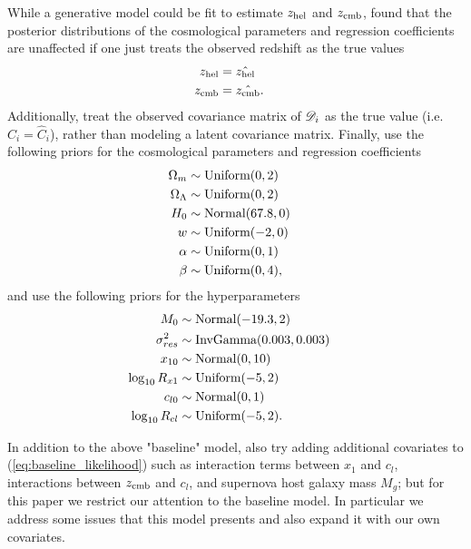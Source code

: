 While a generative model could be fit to estimate $z_{\text{hel}}$ and $z_{\text{cmb}}$, \citet{Shariff+others:2016} found that the posterior distributions of the cosmological parameters and regression coefficients are unaffected if one just treats the observed redshift as the true values
\begin{align}
z_{\text{hel}} &= \hat{z_{\text{hel}}} && \\\nonumber
z_{\text{cmb}} &= \hat{z_{\text{cmb}}}.
\end{align}
Additionally, \citet{Shariff+others:2016} treat the observed covariance matrix of $\mathcal{D}_i$ as the true value (i.e. $C_i = \hat{C}_i$), rather than modeling a latent covariance matrix. Finally, \citet{Shariff+others:2016} use the following priors for the cosmological parameters and regression coefficients
\begin{align}
\Omega_m &\sim \text{Uniform}(0, 2) && \label{eq:baseline_prior} \\\nonumber 
\Omega_\Lambda &\sim \text{Uniform}(0, 2) && \\\nonumber
H_0 &\sim \text{Normal}(67.8, 0) && \\\nonumber
w &\sim \text{Uniform}(-2, 0) && \\\nonumber
\alpha &\sim \text{Uniform}(0, 1) && \\\nonumber 
\beta &\sim \text{Uniform}(0,4),
\end{align}
and use the following priors for the hyperparameters
\begin{align}
M_0 &\sim \text{Normal}(-19.3, 2) && \label{eq:baseline_hyperprior} \\\nonumber 
\sigma_{res}^2 &\sim \text{InvGamma}(0.003, 0.003) && \\\nonumber
x_{10} &\sim \text{Normal}(0, 10) && \\\nonumber 
\log_{10} R_{x1} &\sim \text{Uniform}(-5, 2) && \\\nonumber
c_{l0} &\sim \text{Normal}(0, 1) && \\\nonumber 
\log_{10} R_{cl} &\sim \text{Uniform}(-5,2).
\end{align}

In addition to the above "baseline" model, \citet{Shariff+others:2016} also try adding additional covariates to (\ref{eq:baseline_likelihood}) such as interaction terms between $x_{1}$ and $c_{l}$, interactions between $z_{\text{cmb}}$ and $c_{l}$, and supernova host galaxy mass $M_{g}$; but for this paper we restrict our attention to the baseline model. In particular we address some issues that this model presents and also expand it with our own covariates. 


